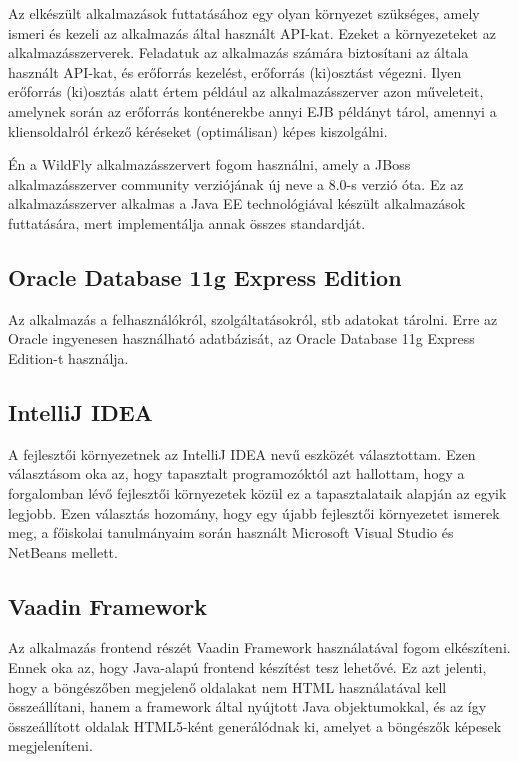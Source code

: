 \documentclass[centeredchapter]{thesis-ekf}
\theoremstyle{definition}
\theoremstyle{remark}
\begin{document}
Az elkészült alkalmazások futtatásához egy olyan környezet szükséges, amely ismeri és kezeli az alkalmazás által használt API-kat. Ezeket a környezeteket az alkalmazásszerverek. 
Feladatuk az alkalmazás számára biztosítani az általa használt API-kat, és erőforrás kezelést, erőforrás (ki)osztást végezni. Ilyen erőforrás (ki)osztás alatt értem például az alkalmazásszerver azon műveleteit, amelynek során az erőforrás konténerekbe annyi EJB példányt tárol, amennyi a kliensoldalról érkező kéréseket (optimálisan) képes kiszolgálni.

Én a WildFly alkalmazásszervert fogom használni, amely a JBoss alkalmazásszerver community verziójának új neve a 8.0-s verzió óta. Ez az alkalmazásszerver alkalmas a Java EE technológiával készült alkalmazások futtatására, mert implementálja annak összes standardját.  

\subsection{Oracle Database 11g Express Edition}

Az alkalmazás a felhasználókról, szolgáltatásokról, stb adatokat tárolni. Erre az Oracle ingyenesen használható adatbázisát, az Oracle Database 11g Express Edition-t használja.
\subsection{IntelliJ IDEA}

A fejlesztői környezetnek az IntelliJ IDEA nevű eszközét választottam. Ezen választásom oka az, hogy tapasztalt programozóktól azt hallottam, hogy a forgalomban lévő fejlesztői környezetek közül ez a tapasztalataik alapján az egyik legjobb. Ezen választás hozomány, hogy egy újabb fejlesztői környezetet ismerek meg, a főiskolai tanulmányaim során használt Microsoft Visual Studio és NetBeans mellett.

\subsection{Vaadin Framework}

Az alkalmazás frontend részét Vaadin Framework használatával fogom elkészíteni. Ennek oka az, hogy Java-alapú frontend készítést tesz lehetővé. Ez azt jelenti, hogy a böngészőben megjelenő oldalakat nem HTML használatával kell összeállítani, hanem a framework által nyújtott Java objektumokkal, és az így összeállított oldalak HTML5-ként generálódnak ki, amelyet a böngészők képesek megjeleníteni.
\end{document}
